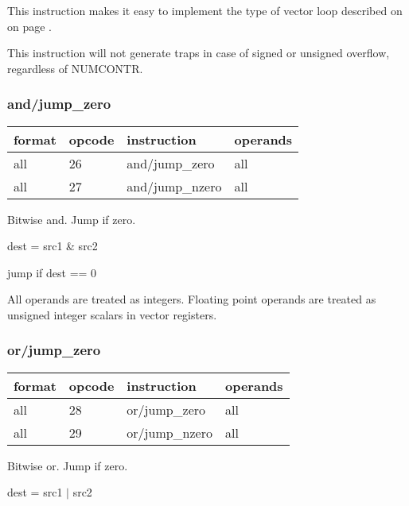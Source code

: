 \documentclass[forwardcom.tex]{subfiles}
\begin{document}
This instruction makes it easy to implement the type of vector loop described on on page \pageref{vectorLoops}.
\vspace{2mm}

This instruction will not generate traps in case of signed or unsigned overflow, regardless of NUMCONTR.
\vspace{2mm}


\subsubsection{and/jump\_zero}
\label{table:andJumpZeroInstruction}
\begin{tabular}{|p{16mm}|p{12mm}|p{60mm}|p{50mm}|}
\hline
\bfseries format & \bfseries opcode & \bfseries instruction & \bfseries operands \\ \hline
all & 26 & and/jump\_zero & all \\ \hline
all & 27 & and/jump\_nzero & all \\ \hline
\end{tabular}
\vspace{2mm}

Bitwise and. Jump if zero.
\vspace{2mm}

dest = src1 \& src2

jump if dest == 0
\vspace{2mm}

All operands are treated as integers. 
Floating point operands are treated as unsigned integer scalars in vector registers.
\vspace{2mm}

\subsubsection{or/jump\_zero}
\label{table:orJumpZeroInstruction}
\begin{tabular}{|p{16mm}|p{12mm}|p{60mm}|p{50mm}|}
\hline
\bfseries format & \bfseries opcode & \bfseries instruction & \bfseries operands \\ \hline
all & 28 & or/jump\_zero & all \\ \hline
all & 29 & or/jump\_nzero & all \\ \hline
\end{tabular}
\vspace{2mm}

Bitwise or. Jump if zero.
\vspace{2mm}

dest = src1 $|$ src2
\end{document}
